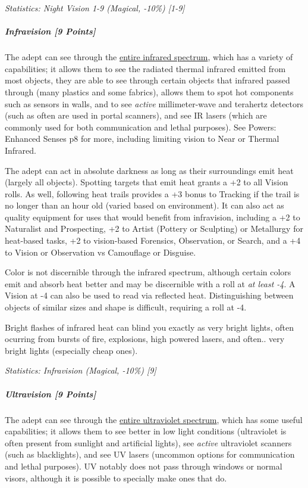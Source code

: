 \begin{multicols*}{3}
		\textcolor{OliveGreen}{\textit{Statistics: Night Vision 1-9 (Magical, -10\%) [1-9]}}
		
	\subparagraph{Infravision [9 Points]}
	
		The adept can see through the \textcolor{NavyBlue}{\href{https://en.wikipedia.org/wiki/Infrared}{entire infrared spectrum}}, which has a variety of capabilities; it allows them to see the radiated thermal infrared emitted from most objects, they are able to see through certain objects that infrared passed through (many plastics and some fabrics), allows them to spot hot components such as sensors in walls, and to see \textit{active} millimeter-wave and terahertz detectors (such as often are used in portal scanners), and see IR lasers (which are commonly used for both communication and lethal purposes). See Powers: Enhanced Senses p8 for more, including limiting vision to Near or Thermal Infrared.
		
		The adept can act in absolute darkness as long as their surroundings emit heat (largely all objects). Spotting targets that emit heat grants a +2 to all Vision rolls. As well, following heat trails provides a +3 bonus to Tracking if the trail is no longer than an hour old (varied based on environment). It can also act as quality equipment for uses that would benefit from infravision, including a +2 to Naturalist and Prospecting, +2 to Artist (Pottery or Sculpting) or Metallurgy for heat-based tasks, +2 to vision-based Forensics, Observation, or Search, and a +4 to Vision or Observation vs Camouflage or Disguise.
		
		Color is not discernible through the infrared spectrum, although certain colors emit and absorb heat better and may be discernible with a roll at \textit{at least -4}. A Vision at -4 can also be used to read via reflected heat. Distinguishing between objects of similar sizes and shape is difficult, requiring a roll at -4. 
		
		Bright flashes of infrared heat can blind you exactly as very bright lights, often ocurring from bursts of fire, explosions, high powered lasers, and often.. very bright lights (especially cheap ones).
	
		\textcolor{OliveGreen}{\textit{Statistics: Infravision (Magical, -10\%) [9] }}
			
	\subparagraph{Ultravision [9 Points]}
	
		The adept can see through the \textcolor{NavyBlue}{\href{https://en.wikipedia.org/wiki/Ultraviolet}{entire ultraviolet spectrum}}, which has some useful capabilities; it allows them to see better in low light conditions (ultraviolet is often present from sunlight and artificial lights), see \textit{active} ultraviolet scanners (such as blacklights), and see UV lasers (uncommon options for communication and lethal purposes). UV notably does not pass through windows or normal visors, although it is possible to specially make ones that do.
		

\end{multicols*}
